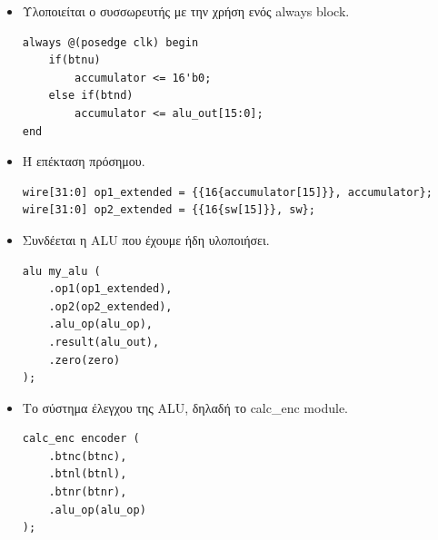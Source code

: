 \documentclass[a4paper,12pt]{report}
\def\tl{\textlatin}
\begin{document}
    \begin{itemize}
        \item Υλοποιείται ο συσσωρευτής με την χρήση ενός \tl{always block}.
            \vspace{0.5cm}
            \begin{lstlisting}[style=verilog]
always @(posedge clk) begin
    if(btnu)
        accumulator <= 16'b0;
    else if(btnd)
        accumulator <= alu_out[15:0];
end 
            \end{lstlisting}
        \newpage
        \item Ή επέκταση πρόσημου.
            \vspace{0.5cm}
            \begin{lstlisting}[style=verilog]
wire[31:0] op1_extended = {{16{accumulator[15]}}, accumulator};
wire[31:0] op2_extended = {{16{sw[15]}}, sw};
            \end{lstlisting}
        \item Συνδέεται η \tl{ALU} που έχουμε ήδη υλοποιήσει.
            \vspace{0.5cm}
            \begin{lstlisting}[style=verilog]
alu my_alu (
    .op1(op1_extended),
    .op2(op2_extended),
    .alu_op(alu_op),
    .result(alu_out),
    .zero(zero)
); 
            \end{lstlisting}
        \item Το σύστημα έλεγχου της \tl{ALU}, δηλαδή το \tl{calc\_enc} module.
            \vspace{0.5cm}
            \begin{lstlisting}[style=verilog]
calc_enc encoder (
    .btnc(btnc),
    .btnl(btnl),
    .btnr(btnr),
    .alu_op(alu_op)
);
            \end{lstlisting}
    \end{itemize}
    \begin{figure}[h!]
        \centering
        \caption{}
    \end{figure}
\end{document}
